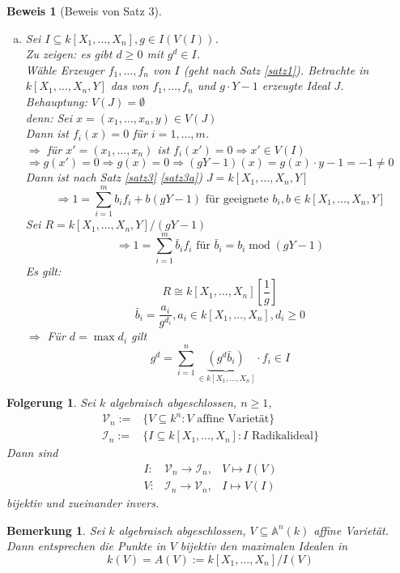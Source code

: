 \documentclass[a4paper,12pt]{report}
\theoremstyle{break}
\newtheorem{Bem}[Def]{Bemerkung}
\newtheorem{Folg}[Def]{Folgerung}
\theoremstyle{nonumberbreak}
\newtheorem{Bew}{Beweis}
\theoremstyle{nonumberplain}
\DeclareMathOperator{\modmodulo}{mod}%
\newcommand{\A}{\mathbb{A}}
\begin{document}
\begin{Bew}[Beweis von Satz 3]
\begin{enumerate}[a)]
\item
Sei $I\subseteq k[X_1,\dots ,X_n], g\in I(V(I))$.\\
\emph{Zu zeigen:}  es gibt $d\geq 0$ mit $g^d\in I$.\\
W\"ahle Erzeuger $f_1,\dots , f_n$ von $I$ (geht nach Satz \ref{satz1}).
Betrachte in $k[X_1,\dots ,X_n,Y]$ das von $f_1,\dots ,f_n$ und $g\cdot Y-1$ erzeugte Ideal $J$.\\
\emph{Behauptung:} $V(J) = \emptyset$\\
\emph{denn:} Sei $x= (x_1,\dots ,x_n, y) \in V(J)$\\
Dann ist $f_i(x)= 0$ f\"ur $i=1,\dots ,m$.\\
$\Rightarrow $ f\"ur $x'=(x_1,\dots ,x_n)$ ist $f_i(x')=0 \Rightarrow x'\in V(I)$\\
$\Rightarrow g(x')=0 \Rightarrow g(x)=0\Rightarrow (gY-1)(x)=g(x)\cdot y-1 = -1 \not=0$\\
Dann ist nach Satz \ref{satz3} \ref{satz3a}) $J=k[X_1,\dots ,X_n,Y]$
\[\Rightarrow 1= \sum_{i=1}^m b_i f_i + b(gY-1) \textrm{ f\"ur geeignete }b_i, b\in k[X_1,\dots ,X_n,Y]\]
Sei $R =k[X_1,\dots ,X_n,Y]/(gY-1)$
\[\Rightarrow 1=\sum_{i=1}^m \bar{b}_if_i \textrm{ f\"ur }\bar{b}_i = b_i \modmodulo(gY-1)\]
\emph{Es gilt:} \[R\cong k[X_1,\dots ,X_n][\frac{1}{g}]\]
\[\bar b_i= \frac{a_i}{g^{d_i}}, a_i\in k[X_1,\dots ,X_n], d_i \geq0\]
$\Rightarrow$ F\"ur $d= \max d_i$ gilt
	\[g^d = \sum_{i=1}^n \underbrace{\left( g^d \bar b_i \right)}_{\in k[X_1,\dots ,X_n]} \cdot f_i \in I\]
\end{enumerate}\end{Bew}

\begin{Folg}
Sei $k$ algebraisch abgeschlossen, $n\geq 1$,
	\[\begin{array}{rl}\mathcal{V}_n := & \{V\subseteq k^n : V \textrm{ affine Variet\"at}\}\\
	\mathcal{I}_n := & \{ I\subseteq k[X_1,\dots ,X_n] : I \textrm{ Radikalideal}\} \end{array}\]
Dann sind \[\begin{array}{rll}
	I: & \mathcal{V}_n \to \mathcal{I}_n, & V \mapsto I(V)\\
	V: & \mathcal{I}_n \to \mathcal{V}_n, & I \mapsto V(I)\end{array}\]
bijektiv und zueinander invers.
\end{Folg}

\begin{Bem}
Sei $k$ algebraisch abgeschlossen, $V\subseteq \A ^n(k)$ affine Variet\"at.\\
Dann entsprechen die Punkte in $V$ bijektiv den maximalen Idealen in \[
	k(V) =A(V):= k[X_1,\dots ,X_n]/I(V) \]
\end{Bem}
\end{document}
